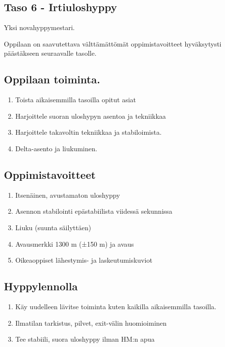 \begin{multicols}{2}
\section{ Taso 6 - Irtiuloshyppy }
\label{nova-alkeiskoulutuksen-suoritukset-taso-6-irtiuloshyppy}


Yksi novahyppymestari. 


Oppilaan on saavutettava välttämättömät oppimistavoitteet hyväksytysti päästäkseen seuraavalle tasolle. 

\subsection{ Oppilaan toiminta. }
\label{nova-alkeiskoulutuksen-suoritukset-oppilaan-toiminta}

\begin{enumerate}[label=\bfseries \arabic*)]
\item  Toista aikaisemmilla tasoilla opitut asiat 
\item  Harjoittele suoran uloshypyn asentoa ja tekniikkaa 
\item  Harjoittele takavoltin tekniikkaa ja stabiloimista. 
\item  Delta-asento ja liukuminen. 
\end{enumerate}
\subsection{ Oppimistavoitteet }
\label{nova-alkeiskoulutuksen-suoritukset-oppimistavoitteet}

\begin{enumerate}[label=\bfseries \arabic*)]
\item  Itsenäinen, avustamaton uloshyppy 
\item  Asennon stabilointi epästabiilista viidessä sekunnissa 
\item  Liuku (suunta säilyttäen) 
\item  Avausmerkki 1300 m (±150 m) ja avaus  
\item  Oikeaoppiset lähestymis- ja laskeutumiskuviot 
\end{enumerate}
\subsection{ Hyppylennolla }
\label{nova-alkeiskoulutuksen-suoritukset-hyppylennolla}

\begin{enumerate}[label=\bfseries \arabic*)]
\item  Käy uudelleen lävitse toiminta kuten kaikilla aikaisemmilla tasoilla. 
\item  Ilmatilan tarkistus, pilvet, exit-välin huomioiminen  
\item  Tee stabiili, suora uloshyppy ilman HM:n apua 
\end{enumerate}

\end{multicols}
